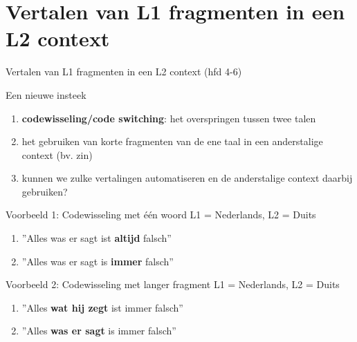 \documentclass[8pt]{beamer}
\begin{document}
\section{Vertalen van L1 fragmenten in een L2 context}


\begin{frame}{Vertalen van L1 fragmenten in een L2 context (hfd 4-6)}
    \begin{block}{Een nieuwe insteek}
        \begin{enumerate}
            \item \textbf{codewisseling/code switching}: het overspringen tussen twee talen
            \item het gebruiken van korte fragmenten van de ene taal in een anderstalige context (bv. zin)
            \item kunnen we zulke vertalingen automatiseren en de anderstalige context daarbij gebruiken?
        \end{enumerate}
    \end{block}

    \begin{block}{Voorbeeld 1: Codewisseling met één woord}
        L1 = Nederlands, L2 = Duits
        \begin{enumerate}
            \item ''Alles was er sagt ist \textbf{altijd} falsch''
            \item ''Alles was er sagt is \textbf{immer} falsch''
        \end{enumerate}
    \end{block}

    \begin{block}{Voorbeeld 2: Codewisseling met langer fragment}
        L1 = Nederlands, L2 = Duits
        \begin{enumerate}
            \item ''Alles \textbf{wat hij zegt} ist immer falsch''
            \item ''Alles \textbf{was er sagt} is immer falsch''
        \end{enumerate}
    \end{block}
\end{frame}
\end{document}
